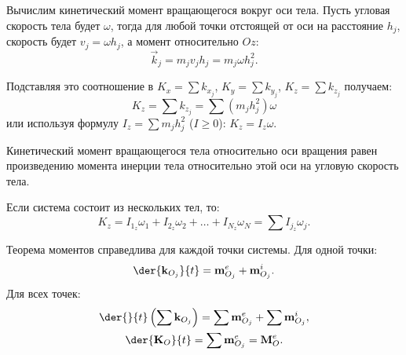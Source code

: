 Вычислим кинетический момент вращающегося вокруг оси тела. Пусть угловая
скорость тела будет \( \omega \), тогда для любой точки отстоящей от оси на
расстояние \( h_j \), скорость будет \( v_j = \omega h_j \), а момент
относительно \( Oz \):
\[
    \vec{k}_j = m_j v_j h_j = m_j\omega h_j^2.
\]

Подставляя это соотношение в \( K_x = \sum k_{x_j} \),
\( K_y = \sum k_{y_j} \), \( K_z = \sum k_{z_j} \) получаем:
\[
    K_z = \sum k_{z_j} = \sum (m_j h_j^2)\omega
\] 
или используя формулу \( I_z = \sum m_j h_j^2 \) (\( I \ge 0 \)):
\( K_z = I_z\omega \).
 
Кинетический момент вращающегося тела относительно оси вращения равен
произведению момента инерции тела относительно этой оси на угловую скорость
тела.

Если система состоит из нескольких тел, то:
\[
    K_z = I_{1_z}\omega_1 + I_{2_z}\omega_2 + \ldots + I_{N_z}\omega_N =
    \sum I_{j_z}\omega_j.
\]
 
Теорема моментов справедлива для каждой точки системы. Для одной точки:
\[
    \der{\vec{k}_{O_j}}{t} = \vec{m}^e_{O_j} +
    \vec{m}^i_{O_j}.
\]
Для всех точек:
\begin{gather*}
    \der{}{t}\left(\sum\vec{k}_{O_j}\right) =
    \sum\vec{m}^e_{O_j} + \sum\vec{m}^i_{O_j}, \\
    \der{\vec{K}_O}{t} = \sum\vec{m}^e_{O_j} = \vec{M}^e_O.
\end{gather*}

\newpage
